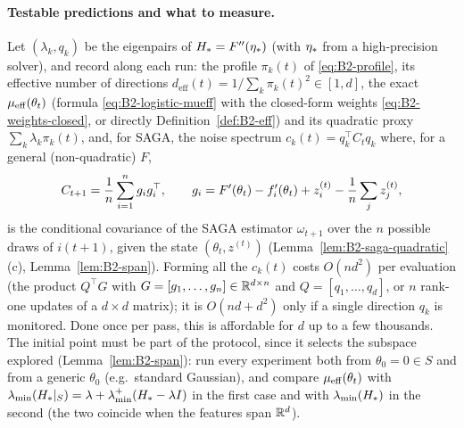 \paragraph{Testable predictions and what to measure.}
Let $(\lambda_k,q_k)$ be the eigenpairs of $H_\ast=F''(\eta_\ast)$ (with $\eta_\ast$ from a high-precision solver),
and record along each run: the profile $\pi_k(t)$ of \eqref{eq:B2-profile}, its effective number of directions
$d_{\mathrm{eff}}(t)=1/\sum_k\pi_k(t)^2\in[1,d]$, the exact $\mu_{\mathrm{eff}}(\theta_t)$ (formula
\eqref{eq:B2-logistic-mueff} with the closed-form weights \eqref{eq:B2-weights-closed}, or directly
Definition~\ref{def:B2-eff}) and its quadratic proxy $\sum_k\lambda_k\pi_k(t)$, and, for SAGA, the noise spectrum
$c_k(t)=q_k^\top C_tq_k$ where, for a general (non-quadratic) $F$,
\[
C_{t+1}=\frac1n\sum_{i=1}^ng_ig_i^\top,\qquad g_i=F'(\theta_t)-f'_i(\theta_t)+z_i^{(t)}-\frac1n\sum_jz_j^{(t)} ,
\]
is the conditional covariance of the SAGA estimator $\omega_{t+1}$ over the $n$ possible draws of $i(t+1)$, given the
state $(\theta_t,z^{(t)})$ (Lemma~\ref{lem:B2-saga-quadratic}(c), Lemma~\ref{lem:B2-span}). Forming all the $c_k(t)$
costs $O(nd^2)$ per evaluation (the product $Q^\top G$ with $G=[g_1,\dots,g_n]\in\mathbb{R}^{d\times n}$ and
$Q=[q_1,\dots,q_d]$, or $n$ rank-one updates of a $d\times d$ matrix); it is $O(nd+d^2)$ only if a single direction
$q_k$ is monitored. Done once per pass, this is affordable for $d$ up to a few thousands. The initial point must be
part of the protocol, since it selects the subspace explored (Lemma~\ref{lem:B2-span}): run every experiment both
from $\theta_0=0\in S$ and from a generic $\theta_0$ (e.g.\ standard Gaussian), and compare $\mu_{\mathrm{eff}}(\theta_t)$ with
$\lambda_{\min}(H_\ast|_S)=\lambda+\lambda^+_{\min}(H_\ast-\lambda I)$ in the first case and with $\lambda_{\min}(H_\ast)$ in the second
(the two coincide when the features span $\mathbb{R}^d$).
